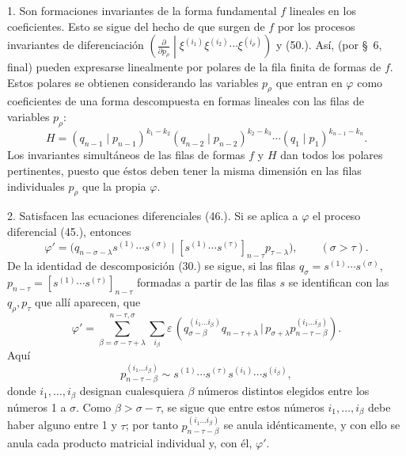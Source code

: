 \documentclass[11pt]{article}
\newcommand{\pair}[2]{(#1\,|\,#2)}
\newcommand{\eps}{\varepsilon}
\begin{document}
1. Son formaciones invariantes de la forma fundamental $f$ lineales en los coeficientes. Esto se sigue del hecho de que surgen de $f$ por los procesos invariantes de diferenciación $\left(\frac{\partial}{\partial p_\rho}\middle|\xi^{(i_1)}\xi^{(i_2)}\cdots\xi^{(i_\rho)}\right)$ y (50.). Así, (por \S\ 6, final) pueden expresarse linealmente por polares de la fila finita de formas de $f$. Estos polares se obtienen considerando las variables $p_\rho$ que entran en $\varphi$ como coeficientes de una forma descompuesta en formas lineales con las filas de variables $p_\rho$:
\begin{equation}
 H=(q_{n-1}\mid p_{n-1})^{k_1-k_2}(q_{n-2}\mid p_{n-2})^{k_2-k_3}\cdots(q_1\mid p_1)^{k_{n-1}-k_n}.
\tag{52}
\end{equation}
Los invariantes simultáneos de las filas de formas $f$ y $H$ dan todos los polares pertinentes, puesto que éstos deben tener la misma dimensión en las filas individuales $p_\rho$ que la propia $\varphi$.

2. Satisfacen las ecuaciones diferenciales (46.). Si se aplica a $\varphi$ el proceso diferencial (45.), entonces
\[
 \varphi'=\bigl(q_{n-\sigma-\lambda}s^{(1)}\cdots s^{(\sigma)}\mid [s^{(1)}\cdots s^{(\tau)}]_{n-\tau}p_{\tau-\lambda}\bigr),\qquad (\sigma>\tau).
\]
De la identidad de descomposición (30.) se sigue, si las filas $q_\sigma=s^{(1)}\cdots s^{(\sigma)}$, $p_{n-\tau}=[s^{(1)}\cdots s^{(\tau)}]_{n-\tau}$ formadas a partir de las filas $s$ se identifican con las $q_\rho,p_\tau$ que allí aparecen, que
\[
 \varphi'=\sum_{\beta=\sigma-\tau+\lambda}^{n-\tau,\sigma}\sum_{i_\beta}\eps\,
 \pair{q_{\sigma-\beta}^{(i_1\ldots i_\beta)}q_{n-\tau+\lambda}}{p_{\sigma+\lambda}p_{n-\tau-\beta}^{(i_1\ldots i_\beta)}}.
\]
Aquí
\[
 p_{n-\tau-\beta}^{(i_1\ldots i_\beta)}\sim s^{(1)}\cdots s^{(\tau)}s^{(i_1)}\cdots s^{(i_\beta)},
\]
donde $i_1,\ldots,i_\beta$ designan cualesquiera $\beta$ números distintos elegidos entre los números 1 a $\sigma$. Como $\beta>\sigma-\tau$, se sigue que entre estos números $i_1,\ldots,i_\beta$ debe haber alguno entre 1 y $\tau$; por tanto $p_{n-\tau-\beta}^{(i_1\ldots i_\beta)}$ se anula idénticamente, y con ello se anula cada producto matricial individual y, con él, $\varphi'$.
\end{document}

